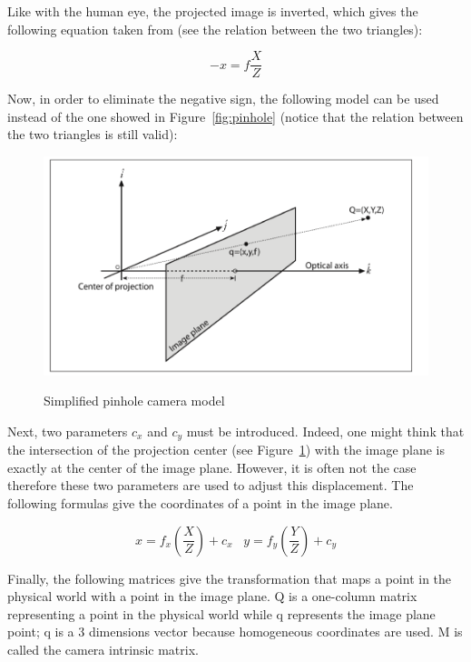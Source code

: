 Like with the human eye, the projected image is inverted, which gives the following equation taken from \cite[p. 371]{bradski_learning_2008} (see the relation between the two triangles):

\begin{equation}
  -x = f\frac{X}{Z}          
\end{equation}

Now, in order to eliminate the negative sign, the following model \cite[p. 372]{bradski_learning_2008} can be used instead of the one showed in Figure~\ref{fig:pinhole} (notice that the relation between the two triangles is still valid):

\begin{figure}[h]
\caption{Simplified pinhole camera model}
\centering
    \includegraphics[width=1.0\textwidth]{images/simplifiedPinhole.png}
\label{fig:simplifiedPinhole}
\end{figure}

Next, two parameters $c_x$ and $c_y$ must be introduced. Indeed, one might think that the intersection of the projection center (see Figure~\ref{fig:simplifiedPinhole}) with the image plane is exactly at the center of the image plane. However, it is often not the case therefore these two parameters are used to adjust this displacement. The following formulas \cite[p. 373]{bradski_learning_2008} give the coordinates of a point in the image plane. 

\begin{equation}
  x = f_x\left(\frac{X}{Z}\right) + c_x \,\,\,\,\, y = f_y\left(\frac{Y}{Z}\right) + c_y    
\end{equation}

Finally, the following matrices \cite[p. 374]{bradski_learning_2008} give the transformation that maps a point in the physical world with a point in the image plane. Q is a one-column matrix representing a point in the physical world while q represents the image plane point; q is a 3 dimensions vector because homogeneous coordinates are used. M is called the camera intrinsic matrix.


